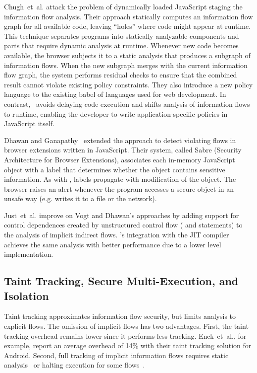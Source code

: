 Chugh~et~al.\cite{chugh.etal+09} attack the problem of dynamically loaded JavaScript staging the information flow analysis.
Their approach statically computes an information flow graph for all available code, leaving ``holes'' where code might appear at runtime.
This technique separates programs into statically analyzable components and parts that require dynamic analysis at runtime.
Whenever new code becomes available, the browser subjects it to a static analysis that produces a subgraph of information flows.
When the new subgraph merges with the current information flow graph, the system performs residual checks to ensure that the combined result cannot violate existing policy constraints.
They also introduce a new policy language to the existing babel of languages used for web development.
In contrast, \FlowCore\ avoids delaying code execution and shifts analysis of information flows to runtime, enabling the developer to write application-specific policies in JavaScript itself.

Dhawan and Ganapathy~\cite{dhawan.ganapath+09} extended the approach to detect violating flows in browser extensions written in JavaScript.
Their system, called Sabre (Security Architecture for Browser Extensions), associates each in-memory JavaScript object with a label that determines whether the object contains sensitive information.
As with \JitFlow, labels propagate with modification of the object.
The browser raises an alert whenever the program accesses a secure object in an unsafe way (e.g. writes it to a file or the network).

Just~et~al.\cite{just.etal+11} improve on Vogt and Dhawan's approaches by adding support for control dependences created by unstructured control flow ( and  statements) to the analysis of implicit indirect flows.
\JitFlow's integration with the JIT compiler achieves the same analysis with better performance due to a lower level implementation.


\subsection{Taint Tracking, Secure Multi-Execution, and Isolation}

Taint tracking approximates information flow security, but limits analysis to explicit flows.
The omission of implicit flows has two advantages.
First, the taint tracking overhead remains lower since it performs less tracking.
Enck~et~al.\cite{enck.etal+10}, for example, report an average overhead of 14\% with their taint tracking solution for Android.
Second, full tracking of implicit information flows requires static analysis~\cite{denning.denning+77,myers+99} or halting execution for some flows~\cite{austin.flanagan+09,austin.flanagan+10}.

